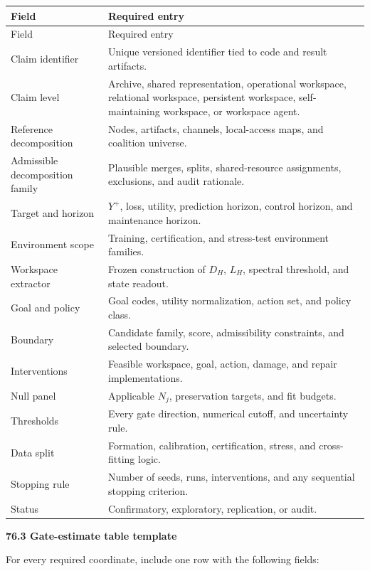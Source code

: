 \documentclass[11pt,letterpaper]{article}
\newcommand{\subtopic}[1]{%
 \vspace{0.45em}
 {\bfseries\color{AccentColor} #1\par}
}
\theoremstyle{plain}
\theoremstyle{definition}
\begin{document}
\begin{longtable}{@{}>{\raggedright\arraybackslash}p{}>{\raggedright\arraybackslash}p{}@{}}
\toprule
Field & Required entry \\
\midrule
\endfirsthead
\toprule
Field & Required entry \\
\midrule
\endhead
Claim identifier & Unique versioned identifier tied to code and result
artifacts. \\
Claim level & Archive, shared representation, operational workspace,
relational workspace, persistent workspace, self-maintaining workspace, or
workspace agent. \\
Reference decomposition & Nodes, artifacts, channels, local-access maps, and coalition universe. \\
Admissible decomposition family & Plausible merges, splits, shared-resource assignments, exclusions, and audit rationale. \\
Target and horizon & \(Y^+\), loss, utility, prediction horizon, control
horizon, and maintenance horizon. \\
Environment scope & Training, certification, and stress-test environment
families. \\
Workspace extractor & Frozen construction of \(D_H\), \(L_H\), spectral
threshold, and state readout. \\
Goal and policy & Goal codes, utility normalization, action set, and policy
class. \\
Boundary & Candidate family, score, admissibility constraints, and selected
boundary. \\
Interventions & Feasible workspace, goal, action, damage, and repair
implementations. \\
Null panel & Applicable \(N_j\), preservation targets, and fit budgets. \\
Thresholds & Every gate direction, numerical cutoff, and uncertainty rule. \\
Data split & Formation, calibration, certification, stress, and cross-fitting
logic. \\
Stopping rule & Number of seeds, runs, interventions, and any sequential
stopping criterion. \\
Status & Confirmatory, exploratory, replication, or audit. \\
\bottomrule
\end{longtable}

\subtopic{76.3 Gate-estimate table template}

For every required coordinate, include one row with the following fields:
\end{document}
